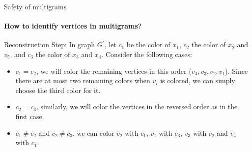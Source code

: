 \documentclass{beamer}
\begin{document}
\begin{frame}{Safety of multigrams}
\framesubtitle{How to identify vertices in multigrams?}
\begin{block}{Reconstruction Step:}
In graph $G^{'}$, let $c_1$ be the color of $x_1$, $c_2$ the color of $x_2$ and $v_5$, and $c_3$ the color of $x_3$ and $x_4$. Consider the following cases:
\begin{itemize}
    \item $c_1 = c_2$, we will color the remaining vertices in this order ($v_4, v_3, v_2, v_1$). Since there are at most two remaining colors when $v_i$ is colored, we can simply choose the third color for it. 
    \item $c_2 = c_3$, similarly, we will color the vertices in the reversed order as in the first case.
    \item $c_1 \ne c_2$ and $c_2 \ne c_3$, we can color $v_2$ with $c_1$, $v_1$ with $c_3$, $v_3$ with $c_2$ and $v_4$ with $c_1$.
\end{itemize}
\end{block}
\end{frame}
\end{document}
